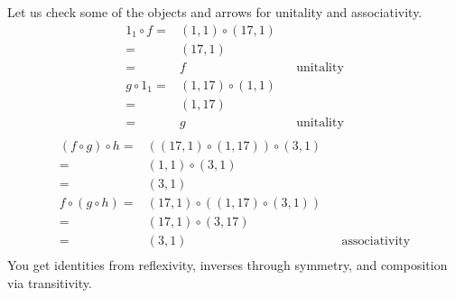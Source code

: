 Let us check some of the objects and arrows for unitality and associativity.
\begin{align*}
	1_1 \circ f = & (1, 1) \circ (17, 1) &  &                  \\
	=             & (17, 1)                                    \\
	=             & f                    &  & \text{unitality} \\
	g \circ 1_1 = & (1, 17) \circ (1, 1)                       \\
	=             & (1, 17)                                    \\
	=             & g                    &  & \text{unitality} \\
\end{align*}
\begin{align*}
	(f \circ g) \circ h = & ((17, 1) \circ (1, 17)) \circ (3, 1)                           \\
	=                     & (1, 1) \circ (3, 1)                                            \\
	=                     & (3, 1)                                                         \\
	f \circ (g \circ h) = & (17, 1) \circ ((1, 17) \circ (3, 1))                           \\
	=                     & (17, 1) \circ (3, 17)                                          \\
	=                     & (3, 1)                               &  & \text{associativity} \\
\end{align*}
You get identities from reflexivity, inverses through symmetry, and composition
via transitivity.

